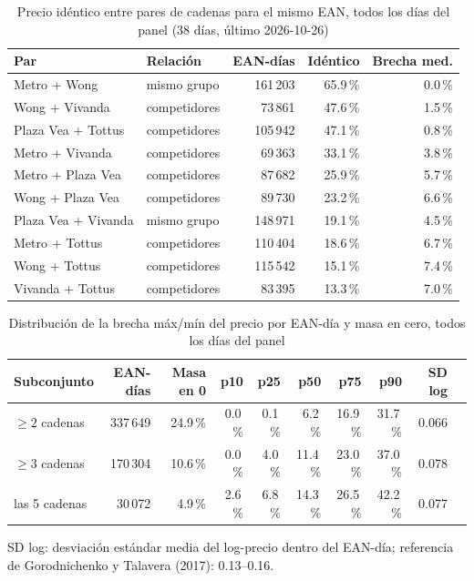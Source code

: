 
\begin{table}[htbp]
\caption{Precio id\'entico entre pares de cadenas para el mismo EAN, todos los d\'ias del panel (38 d\'ias, \'ultimo 2026-10-26)}
\label{tab:identidad}
\centering\scriptsize\setlength{\tabcolsep}{3pt}
\begin{tabular}{@{}llrrr@{}}
\toprule
Par & Relaci\'on & EAN-d\'ias & Id\'entico & Brecha med. \\
\midrule
Metro + Wong & mismo grupo & 161\,203 & 65.9\,\% & 0.0\,\% \\
Wong + Vivanda & competidores & 73\,861 & 47.6\,\% & 1.5\,\% \\
Plaza Vea + Tottus & competidores & 105\,942 & 47.1\,\% & 0.8\,\% \\
Metro + Vivanda & competidores & 69\,363 & 33.1\,\% & 3.8\,\% \\
Metro + Plaza Vea & competidores & 87\,682 & 25.9\,\% & 5.7\,\% \\
Wong + Plaza Vea & competidores & 89\,730 & 23.2\,\% & 6.6\,\% \\
Plaza Vea + Vivanda & mismo grupo & 148\,971 & 19.1\,\% & 4.5\,\% \\
Metro + Tottus & competidores & 110\,404 & 18.6\,\% & 6.7\,\% \\
Wong + Tottus & competidores & 115\,542 & 15.1\,\% & 7.4\,\% \\
Vivanda + Tottus & competidores & 83\,395 & 13.3\,\% & 7.0\,\% \\
\bottomrule\end{tabular}\end{table}

\begin{table}[t]
\caption{Distribuci\'on de la brecha m\'ax/m\'in del precio por EAN-d\'ia y masa en cero, todos los d\'ias del panel}
\label{tab:brecha}
\centering\scriptsize\setlength{\tabcolsep}{4pt}
\begin{tabular}{@{}lrrrrrrrrr@{}}
\toprule
Subconjunto & EAN-d\'ias & Masa en 0 & p10 & p25 & p50 & p75 & p90 & SD log \\
\midrule
$\geq 2$ cadenas & 337\,649 & 24.9\,\% & 0.0\,\% & 0.1\,\% & 6.2\,\% & 16.9\,\% & 31.7\,\% & 0.066 \\
$\geq 3$ cadenas & 170\,304 & 10.6\,\% & 0.0\,\% & 4.0\,\% & 11.4\,\% & 23.0\,\% & 37.0\,\% & 0.078 \\
las 5 cadenas & 30\,072 & 4.9\,\% & 2.6\,\% & 6.8\,\% & 14.3\,\% & 26.5\,\% & 42.2\,\% & 0.077 \\
\bottomrule\end{tabular}
\par\smallskip\raggedright\scriptsize SD log: desviaci\'on est\'andar media del log-precio dentro del EAN-d\'ia; referencia de Gorodnichenko y Talavera (2017): 0.13--0.16.
\end{table}

